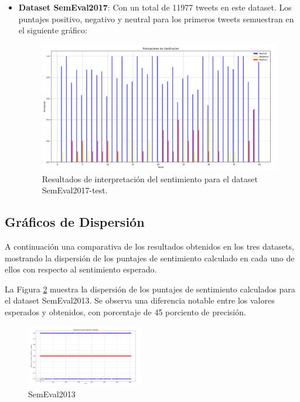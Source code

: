 \documentclass[sigconf, review=false, nonacm]{acmart}
\begin{document}
\begin{itemize}
		\item \textbf{Dataset SemEval2017}: Con un total de 11977 tweets en este dataset.
		Los puntajes positivo, negativo y neutral para los primeros tweets semuestran en el siguiente gráfico:
		\begin{figure}[ht]
			\centering
			\includegraphics[width=\linewidth]{../results/barras/semeval2017.png}
			\caption{Resultados de interpretación del sentimiento para el dataset SemEval2017-test.}
			\label{fig:semeval2017}
		\end{figure}	
	\end{itemize}

\subsection{Gráficos de Dispersión}
A continuación una comparativa de los resultados obtenidos en los tres datasets, mostrando la dispersión de los
puntajes de sentimiento calculado en cada uno de ellos con respecto al sentimiento esperado.

La Figura \ref{fig:semeval2013} muestra la dispersión de los puntajes de sentimiento calculados para el dataset SemEval2013.
Se observa una diferencia notable entre los valores esperados y obtenidos, con porcentaje de 45 porciento de precisión.

\begin{figure}[ht]
	\centering
	\includegraphics[width=0.45\textwidth]{../results/dispersion/semeval2013.png}
	\caption{SemEval2013}
	\label{fig:semeval2013}
\end{figure}
\end{document}

